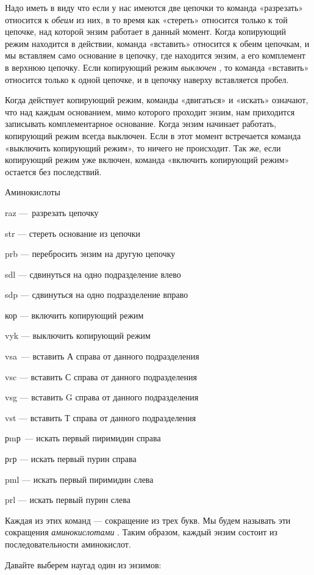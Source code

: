 Надо иметь в виду что если у нас имеются две цепочки то команда «разрезать» относится к \emph{обеим} из них, в то время как «стереть» относится только к той цепочке, над которой энзим работает в данный момент. Когда копирующий режим находится в действии, команда «вставить» относится к обеим цепочкам, и мы вставляем само основание в цепочку, где находится энзим, а его комплемент в верхнюю цепочку. Если копирующий режим \emph{выключен} , то команда «вставить» относится только к одной цепочке, и в цепочку наверху вставляется пробел.

Когда действует копирующий режим, команды «двигаться» и «искать» означают, что над каждым основанием, мимо которого проходит энзим, нам приходится записывать комплементарное основание. Когда энзим начинает работать, копирующий режим всегда выключен. Если в этот момент встречается команда «выключить копирующий режим», то ничего не происходит. Так же, если копирующий режим уже включен, команда «включить копирующий режим» остается без последствий.

Аминокислоты

raz ---~разрезать цепочку

str --- стереть основание из цепочки

prb --- перебросить энзим на другую цепочку

sdl --- сдвинуться на одно подразделение влево

sdp --- сдвинуться на одно подразделение вправо

кор --- включить копирующий режим

vyk --- выключить копирующий режим

vsa~--- вставить А справа от данного подразделения

vsc --- вставить С справа от данного подразделения

vsg --- вставить G справа от данного подразделения

vst --- вставить Т справа от данного подразделения

рmр~--- искать первый пиримидин справа

рrр --- искать первый пурин справа

pml --- искать первый пиримидин слева

prl --- искать первый пурин слева

Каждая из этих команд --- сокращение из трех букв. Мы будем называть эти сокращения \emph{аминокислотами} . Таким образом, каждый энзим состоит из последовательности аминокислот.

Давайте выберем наугад один из энзимов:

